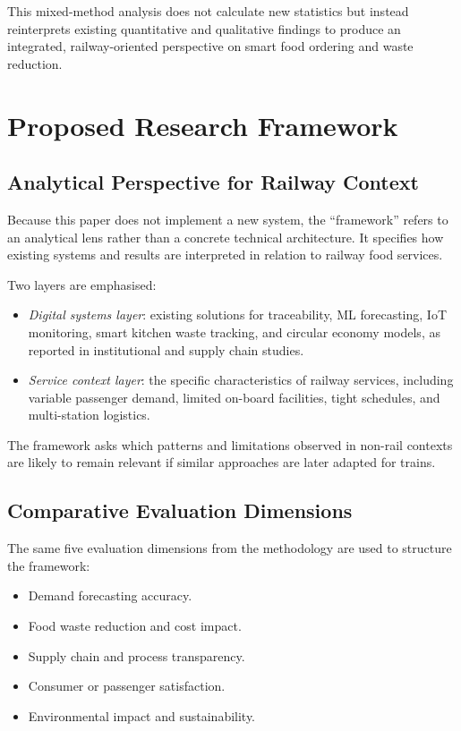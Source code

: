 \documentclass[conference]{IEEEtran}
\begin{document}
This mixed-method analysis does not calculate new statistics but instead reinterprets existing quantitative and qualitative findings to produce an integrated, railway-oriented perspective on smart food ordering and waste reduction.

\section{Proposed Research Framework}

\subsection{Analytical Perspective for Railway Context}

Because this paper does not implement a new system, the “framework” refers to an analytical lens rather than a concrete technical architecture. It specifies how existing systems and results are interpreted in relation to railway food services.

Two layers are emphasised:

\begin{itemize}[leftmargin=*]
\item \textit{Digital systems layer}: existing solutions for traceability, ML forecasting, IoT monitoring, smart kitchen waste tracking, and circular economy models, as reported in institutional and supply chain studies.
\item \textit{Service context layer}: the specific characteristics of railway services, including variable passenger demand, limited on-board facilities, tight schedules, and multi-station logistics.
\end{itemize}

The framework asks which patterns and limitations observed in non-rail contexts are likely to remain relevant if similar approaches are later adapted for trains.

\subsection{Comparative Evaluation Dimensions}

The same five evaluation dimensions from the methodology are used to structure the framework:

\begin{itemize}[leftmargin=*]
\item Demand forecasting accuracy.
\item Food waste reduction and cost impact.
\item Supply chain and process transparency.
\item Consumer or passenger satisfaction.
\item Environmental impact and sustainability.
\end{itemize}
\end{document}
